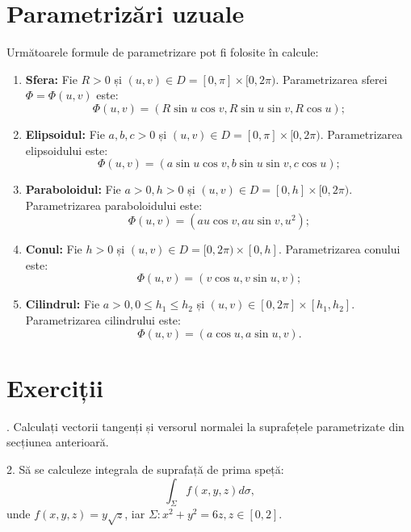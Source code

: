 
\section{Parametrizări uzuale}

Următoarele formule de parametrizare pot fi folosite în calcule:
\begin{enumerate}[(1)]
\item \textbf{Sfera:} Fie $ R > 0 $ și $ (u, v) \in D = [0, \pi] \times [0, 2\pi) $.
  Parametrizarea sferei $ \Phi = \Phi(u, v) $ este:
  \[
    \Phi(u, v) = (R \sin u \cos v, R \sin u \sin v, R \cos u);
  \]
\item \textbf{Elipsoidul:} Fie $ a, b, c > 0 $ și
  $ (u, v) \in D = [0, \pi] \times [0, 2\pi) $. Parametrizarea elipsoidului este:
  \[
    \Phi(u, v) = (a \sin u \cos v, b \sin u \sin v, c \cos u);
  \]
\item \textbf{Paraboloidul:} Fie $ a > 0, h > 0 $ și
  $ (u, v) \in D = [0, h] \times [0, 2\pi) $. Parametrizarea paraboloidului este:
  \[
    \Phi(u, v) = (au\cos v, au \sin v, u^2);
  \]
\item \textbf{Conul:} Fie $ h > 0 $ și $ (u, v) \in D = [0, 2\pi) \times [0, h] $.
  Parametrizarea conului este:
  \[
    \Phi(u, v) = (v \cos u, v \sin u, v);
  \]
\item \textbf{Cilindrul:} Fie $ a > 0, 0 \leq h_1 \leq h_2 $ și
  $ (u, v) \in [0, 2\pi] \times [h_1, h_2] $. Parametrizarea cilindrului
  este:
  \[
    \Phi(u, v) = (a \cos u, a \sin u, v).
  \]
\end{enumerate}



\section{Exerciții}

\indent{}. Calculați vectorii tangenți și versorul normalei la suprafețele
parametrizate din secțiunea anterioară.

\vspace{0.5cm}

2. Să se calculeze integrala de suprafață de prima speță:
\[
  \int_\Sigma f(x, y, z) d\sigma,
\]
unde $ f(x, y, z) = y \sqrt{z} $, iar $ \Sigma: x^2 + y^2 = 6z, z \in [0, 2] $.

\vspace{0.5cm}

